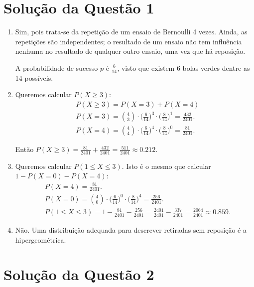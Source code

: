 \documentclass[
	12pt,				%
	openright,			%
	oneside,			%
	a4paper,			%
	english,			%
	brazil,				%
	]{abntex2}
\begin{document}
\imprimircapa
\textual

\section{Solução da Questão 1}


\begin{enumerate}[label=\alph*)]
    \item Sim, pois trata-se da repetição de um ensaio de Bernoulli 4 vezes. Ainda, as repetições são independentes; o resultado de um ensaio não tem influência nenhuma no resultado de qualquer outro ensaio, uma vez que há reposição.
    
    A probabilidade de sucesso $p$ é $\frac{6}{14}$, visto que existem 6 bolas verdes dentre as 14 possíveis.
    
    \item Queremos calcular $P(X \geq 3)$:
    \begin{align*}
        &P(X \geq 3) = P(X = 3) + P(X = 4)\\
        &P(X = 3) = \binom{4}{3} \cdot \biggl(\frac{6}{14}\biggr)^{3} \cdot \biggl(\frac{8}{14}\biggr)^1 = \frac{432}{2401}.\\
        &P(X = 4) = \binom{4}{4} \cdot \biggl(\frac{6}{14}\biggr)^{4} \cdot \biggl(\frac{8}{14}\biggr)^0 = \frac{81}{2401}.
    \end{align*}
    
    Então $P(X \geq 3) = \frac{81}{2401} + \frac{432}{2401} = \frac{511}{2401} \approx 0.212$.
    
    \item Queremos calcular $P(1 \leq X \leq 3)$.
    Isto é o mesmo que calcular ${1 - P(X = 0) - P(X = 4)}$:
    \begin{align*}
        &P(X = 4) = \frac{81}{2401}.\\[0.5em]
        &P(X = 0) = \binom{4}{0} \cdot \biggl(\frac{6}{14}\biggr)^{0} \cdot \biggl(\frac{8}{14}\biggr)^4 = \frac{256}{2401}.\\[0.5em]
        &P(1 \leq X \leq 3) = 1 - \frac{81}{2401} - \frac{256}{2401} = \frac{2401}{2401} - \frac{337}{2401} = \frac{2064}{2401} \approx 0.859.
    \end{align*}

    \item Não. Uma distribuição adequada para descrever retiradas sem reposição é a hipergeométrica.
\end{enumerate}


\section{Solução da Questão 2}
\end{document}
